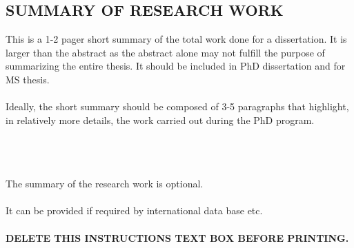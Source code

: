 \documentclass[a4paper,12pt,one side]{report}
\theoremstyle{definition}
\begin{document}
\begin{justify}
\chapter{SUMMARY OF RESEARCH WORK}
 This is a 1-2 pager short summary of the total work done for a dissertation. It is larger than the abstract as the abstract alone may not fulfill the purpose of summarizing the entire thesis. It should be included in PhD dissertation and for MS thesis.\\~\\
Ideally, the short summary should be composed of 3-5 paragraphs that highlight, in relatively more details, the work carried out during the PhD program.\\~\\
\\~\\
\begin{tcolorbox}[enhanced jigsaw,
    sharp corners,
    boxrule=0.5pt, 
    colback=blue!30!white,   
    borderline={0.5pt}{-2pt}{black,solid} %
 ]
 \begin{justify}
The summary of the research work is optional.\\~\\
It can be provided if required by international data base etc.\\~\\
{\bf DELETE THIS INSTRUCTIONS TEXT BOX BEFORE PRINTING.}
 \end{justify}
\end{tcolorbox}

\end{justify}
\end{document}
